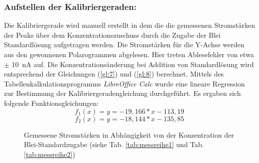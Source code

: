 	\subsubsection*{Aufstellen der Kalibriergeraden:}
	Die Kalibriergerade wird manuell erstellt in dem die die gemessenen Stromstärken der Peaks über dem Konzentrationszuschuss durch die Zugabe der Blei Standardlösung aufgetragen werden. Die Stromstärken für die Y-Achse werden aus den gewonnenen Polarogrammen abgelesen. Hier treten Ablesefehler von etwa $\pm$ \SI{10}{\nano\ampere} auf. Die Konzentrationsänderung bei Addition von Standardlösung wird entsprechend der Gleichungen (\ref{gl:7}) und (\ref{gl:8}) berechnet. Mittels des Tabellenkalkulationsprogramms \textit{LibreOffice Calc} wurde eine lineare Regression zur Bestimmung der Kalibriergeradengleichung durchgeführt. Es ergaben sich folgende Funktionsgleichungen:
	$$f_1(x)=y=-19,166*x - 113,19 $$ 
	$$f_2(x)=y=-18,144*x - 135,85 $$ 
	
	\begin{figure}[h!]
		\begin{center}
			\caption{Gemessene Stromstärken in Abhängigkeit von der Konzentration der Blei-Standardzugabe (siehe Tab. \ref{tab:messreihe1} und Tab. \ref{tab:messreihe2})}
			\label{dia:lnr/lnc}
		\end{center}
	\end{figure}
	\FloatBarrier
	\vspace*{-5mm}
	
